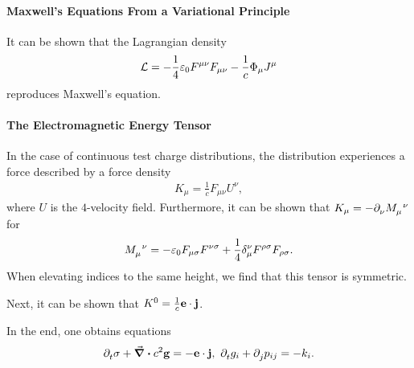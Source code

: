 \paragraph{Maxwell's Equations From a Variational Principle}
It can be shown that the Lagrangian density
\begin{align*}
	\mathcal{L} = -\frac{1}{4}\varepsilon_{0}F^{\mu\nu}F_{\mu\nu} - \frac{1}{c}\Phi_{\mu}J^{\mu}
\end{align*}
reproduces Maxwell's equation.

\paragraph{The Electromagnetic Energy Tensor}
In the case of continuous test charge distributions, the distribution experiences a force described by a force density
\begin{align*}
	K_{\mu} = \frac{1}{c}F_{\mu\nu}U^{\nu},
\end{align*}
where $U$ is the $4$-velocity field. Furthermore, it can be shown that $K_{\mu} = -\del{\nu}{\tensor{M}{_{\mu}^{\nu}}}$ for
\begin{align*}
	\tensor{M}{_{\mu}^{\nu}} = -\varepsilon_{0}F_{\mu\sigma}F^{\nu\sigma} + \frac{1}{4}\kdelta{\nu}{\mu}F^{\rho\sigma}F_{\rho\sigma}.
\end{align*}
When elevating indices to the same height, we find that this tensor is symmetric.

Next, it can be shown that $K^{0} = \frac{1}{c}\vb{e}\cdot\vb{j}$.

In the end, one obtains equations
\begin{align*}
	\del{t}{\sigma} + \div{c^{2}\vb{g}} = -\vb{e}\cdot\vb{j},\ \del{t}{g_{i}} + \del{j}{p_{ij}} = -k_{i}.
\end{align*}